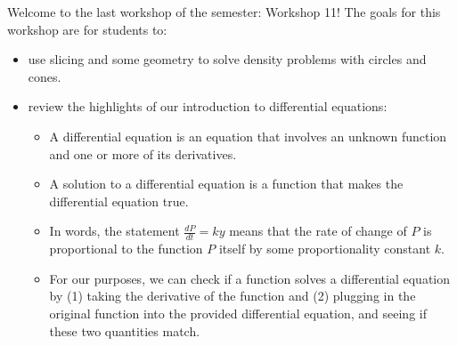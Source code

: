 \documentclass{article}
\begin{document}
\begin{workshop}
    Welcome to the last workshop of the semester: Workshop 11! The goals for this workshop are for students to:
    \begin{itemize}
    \item use slicing and some geometry to solve density problems with circles and cones.
    \item review the highlights of our introduction to differential equations:
    \begin{itemize}
        \item A differential equation is an equation that involves an unknown function and one or more of its derivatives.
        \item A solution to a differential equation is a function that makes the differential equation true.
        \item In words, the statement $\frac{dP}{dt}=ky$ means that the rate of change of $P$ is proportional to the function $P$ itself by some proportionality constant $k$.
        \item For our purposes, we can check if a function solves a differential equation by (1) taking the derivative of the function and (2) plugging in the original function into the provided differential equation, and seeing if these two quantities match.
    \end{itemize}
    \end{itemize}
\end{workshop}
\end{document}

